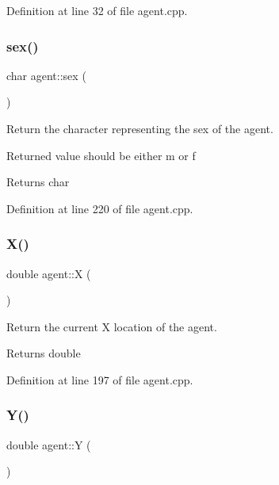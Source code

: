 Definition at line 32 of file agent.\+cpp.

\mbox{\label{classagent_a0c0cbe17943c2fc044905fe877b14ade}} 
\subsubsection{\texorpdfstring{sex()}{sex()}}
{\footnotesize\ttfamily char agent\+::sex (\begin{DoxyParamCaption}{ }\end{DoxyParamCaption})}



Return the character representing the sex of the agent. 

Returned value should be either \textquotesingle{}m\textquotesingle{} or \textquotesingle{}f\textquotesingle{}

\begin{DoxyReturn}{Returns}
char 
\end{DoxyReturn}


Definition at line 220 of file agent.\+cpp.

\mbox{\label{classagent_a312bd1aeb3c660f43bb3bf5a8f0764e7}} 
\subsubsection{\texorpdfstring{X()}{X()}}
{\footnotesize\ttfamily double agent\+::X (\begin{DoxyParamCaption}{ }\end{DoxyParamCaption})}



Return the current X location of the agent. 

\begin{DoxyReturn}{Returns}
double 
\end{DoxyReturn}


Definition at line 197 of file agent.\+cpp.

\mbox{\label{classagent_a56b8ea7b9138c5e4b92530d454e247ad}} 
\subsubsection{\texorpdfstring{Y()}{Y()}}
{\footnotesize\ttfamily double agent\+::Y (\begin{DoxyParamCaption}{ }\end{DoxyParamCaption})}



